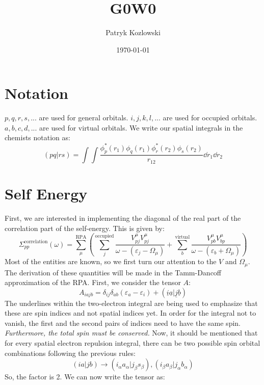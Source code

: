 \documentclass[12pt]{article}
\author{Patryk Kozlowski}
\title{G0W0}
\date{\today}
\begin{document}
\maketitle
\section{Notation}
$p,q,r,s,...$ are used for general orbitals. $i,j,k,l,...$ are used for occupied orbitals. $a,b,c,d,...$ are used for virtual orbitals. We write our spatial integrals in the chemists notation as:
\begin{equation}
    (pq|rs) = \int \int \frac{\phi _{p}^{*}(r_{1}) \phi _{q}(r_{1}) \phi _{r}^{*}(r_{2}) \phi _{s}(r_{2})}{r_{12}} \dd r _{1} \dd r _{2}
\end{equation}
\section{Self Energy}
First, we are interested in implementing the diagonal of the real part of the correlation part of the self-energy. This is given by:
\begin{equation}
    \Sigma_{pp}^{\text{correlation}}(\omega) = \sum_{\mu }^{\text{RPA}}\left(\sum_{j}^{\text{occupied}} \frac{V_{pj}^{\mu }V_{pj}^{\mu }}{\omega -(\varepsilon _{j}-\Omega  _{\mu })}+ \sum_{b}^{\text{virtual}} \frac{V_{pb}^{\mu }V_{bp}^{\mu }}{\omega -(\varepsilon _{b}+\Omega  _{\mu })}\right)
\end{equation}
Most of the entities are known, so we first turn our attention to the $V$ and $\Omega_{\mu }$. The derivation of these quantities will be made in the Tamm-Dancoff approximation of the RPA. First, we consider the tensor $A$:
\begin{equation}
    A_{iajb}=\delta _{ij} \delta _{ab} \left(\varepsilon _{a}-\varepsilon _{i}\right) + (\underline{i} \underline{a} | \underline{j} \underline{b} )
\end{equation}
The underlines within the two-electron integral are being used to emphasize that these are spin indices and not spatial indices yet. In order for the integral not to vanish, the first and the second pairs of indices need to have the same spin. \emph{Furthermore, the total spin must be conserved.} Now, it should be mentioned that for every spatial electron repulsion integral, there can be two possible spin orbital combinations following the previous rules:
\begin{equation}
    (ia|jb) \rightarrow (i_{\alpha }a_{\alpha }|j_{\beta }s_{\beta }) , (i_{\beta }a_{\beta }|j_{\alpha }b_{\alpha })
\end{equation}
So, the factor is 2. We can now write the tensor as:
\end{document}
